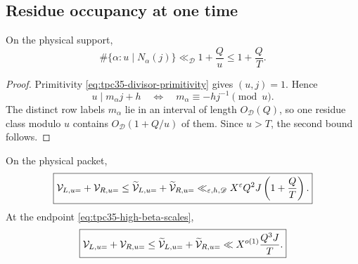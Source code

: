 \subsection{Residue occupancy at one time}

\begin{lemma}
\label{lem:tpc35-fixed-uj-occupancy}
On the physical support,
\begin{equation}
 \#\{\alpha:u\mid N_\alpha(j)\}
 \ll_{\mathscr D}1+\frac Qu
 \le 1+\frac QT.
 \label{eq:tpc35-fixed-uj-occupancy}
\end{equation}
\end{lemma}

\begin{proof}
Primitivity \eqref{eq:tpc35-divisor-primitivity} gives \((u,j)=1\).
Hence
\[
 u\mid m_\alpha j+h
 \quad\Longleftrightarrow\quad
 m_\alpha\equiv-hj^{-1}\pmod u.
\]
The distinct row labels \(m_\alpha\) lie in an interval of length
\(O_{\mathscr D}(Q)\), so one residue class modulo \(u\) contains
\(O_{\mathscr D}(1+Q/u)\) of them.  Since \(u>T\), the second bound follows.
\end{proof}

\begin{theorem}
\label{thm:tpc35-shared-ultra}
On the physical packet,
\begin{equation}
 \boxed{
 \mathcal V_{L,u=}+\mathcal V_{R,u=}
 \le\widetilde{\mathcal V}_{L,u=}+\widetilde{\mathcal V}_{R,u=}
 \ll_{\varepsilon,h,\mathscr D}
 X^\varepsilon Q^2J\left(1+\frac QT\right).}
 \label{eq:tpc35-shared-ultra-bound}
\end{equation}
At the endpoint \eqref{eq:tpc35-high-beta-scales},
\begin{equation}
 \boxed{
 \mathcal V_{L,u=}+\mathcal V_{R,u=}
 \le\widetilde{\mathcal V}_{L,u=}+\widetilde{\mathcal V}_{R,u=}
 \ll X^{o(1)}\frac{Q^3J}{T}.}
 \label{eq:tpc35-shared-ultra-endpoint}
\end{equation}
\end{theorem}

